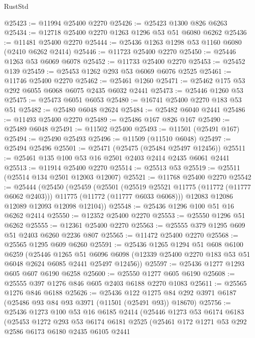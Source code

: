\begin{lexlean}{RustStd}
\begin{coremodule}
@25423 := @11994 @25400 @2270
@25426 := @25423 @1300 @826 @6263
@25434 := @12718 @25400 @2270 @1263 @1296 @53 @51 @6080 @6262
@25436 := @11481 @25400 @2270
@25444 := @25436 @1263 @1298 @53 @1160 @6080 (@2410 @6262 @2414)
@25446 := @11723 @25400 @2270
@25450 := @25446 @1263 @53 @6069 @6078
@25452 := @11733 @25400 @2270
@25453 := @25452 @139
@25459 := @25453 @1262 @293 @53 @6069 @6076 @2525
@25461 := @11746 @25400 @2270
@25462 := @25461 @1260
@25471 := @25462 @175 @53 @292 @6055 @6068 @6075 @2435 @6032 @2441
@25473 := @25446 @1260 @53
@25475 := @25473 @6051 @6053
@25480 := @16741 @25400 @2270 @183 @53 @51
@25482 := @25480 @6048 @2624
@25484 := @25482 @6040 @2441
@25486 := @11493 @25400 @2270
@25489 := @25486 @167 @826 @167
@25490 := @25489 @6048
@25491 := @11502 @25400
@25493 := @11501 (@25491 @167)
@25494 := @25490 @25493
@25496 := @11509 (@11510 @6048)
@25497 := @25494 @25496
@25501 := @25471 (@25475 (@25484 @25497 @12456))
@25511 := @25461 @135 @100 @53 @16 @2501 @2403 @2414 @2435 @6061 @2441
@25513 := @11914 @25400 @2270
@25514 := @25513 @53
@25519 := @25511 (@25514 @134 @2501 @12003 @12007)
@25521 := @11768 @25400 @2270
@25542 := @25444
    (@25450
      (@25459
        (@25501
          (@25519 @25521 @11775 (@11772 (@11777 @6062 @2403)))
          @11775
          (@11772 (@11777 @6033 @6068)))
        @12083
        @12086
        @12089
        @12093
        @12098
        @12104))
@25548 := @25436 @1296 @100 @51 @16 @6262 @2414
@25550 := @12352 @25400 @2270
@25553 := @25550 @1296 @51 @6262
@25555 := @12361 @25400 @2270
@25563 := @25555 @379 @1295 @609 @51 @2403 @6260 @2236 @807
@25565 := @11472 @25400 @2270
@25568 := @25565 @1295 @609 @6260
@25591 := @25436
    @1265
    @1294
    @51
    @608
    @6100
    @6259
    (@25446
      @1265
      @51
      @6096
      @6098
      (@12339 @25400 @2270 @183 @53 @51 @6048 @2624 @6085 @2441 @25497 @12456))
@25597 := @25436 @1277 @1293 @605 @607 @6190 @6258
@25600 := @25550 @1277 @605 @6190
@25608 := @25555 @397 @1276 @846 @605 @2403 @6188 @2270 @1083
@25611 := @25565 @1276 @846 @6188
@25626 := @25436
    @122
    @1275
    @84
    @292
    @3971
    @6187
    (@25486 @93 @84 @93 @3971 (@11501 (@25491 @93)) @18670)
@25756 := @25436
    @1273
    @100
    @53
    @16
    @6185
    @2414
    (@25446
      @1273
      @53
      @6174
      @6183
      (@25453
        @1272
        @293
        @53
        @6174
        @6181
        @2525
        (@25461
          @172
          @1271
          @53
          @292
          @2586
          @6173
          @6180
          @2435
          @6105
          @2441

\end{coremodule}
\end{lexlean}

